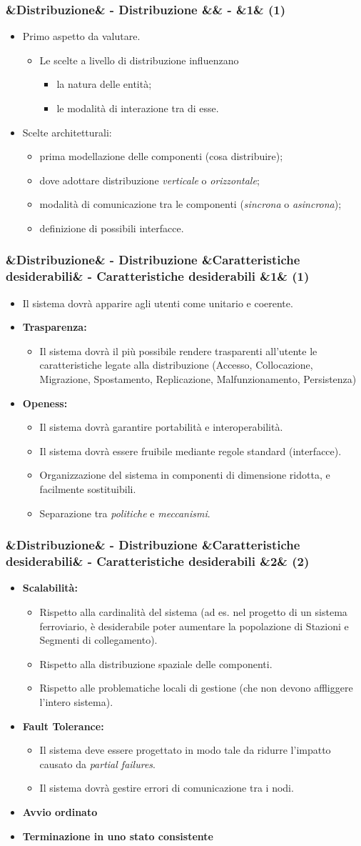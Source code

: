 \documentclass[slidestop,compress,blackandwhite]{beamer}
\newcommand{\itemB}[3]{
	\item \textbf{#1} #2 \vspace{#3}
}
\newcommand{\ii}[1]{\textit{#1}}
\newcommand{\cm}[1]{\vspace{#1cm}}
\newcommand{\newtitle}[4]{
	#1 
	\ifx&#2&%
	\else
  		\large- #2
	\fi
	\ifx&#3&%
	\else
  		\small- #3
	\fi
	\ifx&#4&%
	\else
  		\normalsize (#4)
	\fi
}
\newcommand{\newframe}[5]{
	\begin{frame}
		\frametitle{\newtitle{#1}{#2}{#3}{#4}}
		#5
	\end{frame}
}
\newcommand{\myitemize}[1]{
	\begin{itemize}\itemsep4pt
	#1
	\end{itemize}
}
\begin{document}
	
	\newframe{}{Distribuzione}{}{1}{
		\cm{0.4}
		\myitemize {
			\item Primo aspetto da valutare.
				\myitemize{
					\item Le scelte a livello di distribuzione influenzano
					\myitemize {
						\item la natura delle entità;\\
					 	\item le modalità di interazione tra di esse.
					}
				}
			\cm{0.2}
			\item Scelte architetturali:
				\myitemize{
					\item prima modellazione delle componenti (cosa distribuire);
					\item dove adottare distribuzione \ii{verticale} o \ii{orizzontale};
					\item modalità di comunicazione tra le componenti (\ii{sincrona} o \ii{asincrona});
					\item definizione di possibili interfacce.		
				}
		}
	}

	\newframe{}{Distribuzione}{Caratteristiche desiderabili}{1}{
		\myitemize {
			\item Il sistema dovrà apparire agli utenti come unitario e coerente. 
			\itemB{Trasparenza:}{
				\myitemize {
					\item Il sistema dovrà il più possibile rendere trasparenti all'utente le caratteristiche legate alla distribuzione (Accesso, Collocazione, Migrazione, Spostamento, Replicazione, Malfunzionamento, Persistenza)
				}
			}{0.1cm}
			\itemB{Openess:}{\justifying
				\myitemize {
					\item Il sistema dovrà garantire portabilità e interoperabilità.
					\item Il sistema dovrà essere fruibile mediante regole standard (interfacce).
					\item \justifying Organizzazione del sistema in componenti di dimensione ridotta, e facilmente sostituibili.
					\item Separazione tra \ii{politiche} e \ii{meccanismi}.
				}
			}{0.1cm}
		}
	}
	
	\newframe{}{Distribuzione}{Caratteristiche desiderabili}{2}{
			\cm{-0.2}
			\myitemize {
				\itemB{Scalabilità:}{\justifying
					\myitemize {
						\item Rispetto alla cardinalità del sistema (ad es. nel progetto di un sistema ferroviario, è desiderabile poter aumentare la popolazione di Stazioni e Segmenti di collegamento).
						\item Rispetto alla distribuzione spaziale delle componenti.
						\item Rispetto alle problematiche locali di gestione (che non devono affliggere l'intero sistema).
					}
				}{0cm}
				\itemB{ Fault Tolerance:}{
					\myitemize{
						\item Il sistema deve essere progettato in modo tale da ridurre l'impatto causato da \ii{partial failures}.
						\item Il sistema dovrà gestire errori di comunicazione tra i nodi.
					}
				}{0cm}
				\itemB{Avvio ordinato}{}{0cm}
				\itemB{Terminazione in uno stato consistente}{}{0cm}
			}
	}
\end{document}

